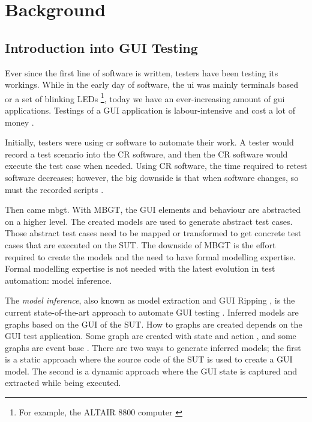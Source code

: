 \chapter{Background} \label{chapter:background}

\section{Introduction into GUI Testing}
Ever since the first line of software is written, testers have been testing its workings. While in the early day of software, the \acrfull{ui} was mainly terminals based or a set of blinking LEDs \cite{altair8800} \footnote{For example, the ALTAIR 8800 computer \cite{altair8800}}, today we have an ever-increasing amount of \acrfull{gui} applications. Testings of a GUI application is labour-intensive and cost a lot of money \cite{gui-history}.

Initially, testers were using \acrfull{cr} software to automate their work. A tester would record a test scenario into the CR software, and then the CR software would execute the test case when needed. Using CR software, the time required to retest software decreases; however, the big downside is that when software changes, so must the recorded scripts \cite{gui-history}.

Then came \acrfull{mbgt}. With MBGT, the GUI elements and behaviour are abstracted on a higher level. The created models are used to generate abstract test cases. Those abstract test cases need to be mapped or transformed to get concrete test cases that are executed on the SUT. The downside of MBGT is the effort required to create the models and the need to have formal modelling expertise. Formal modelling expertise is not needed with the latest evolution in test automation: model inference. 

The \emph{model inference}, also known as model extraction and GUI Ripping \cite{gui-ripping}, is the current state-of-the-art approach to automate GUI testing \cite{gui-history}. Inferred models are graphs based on the GUI of the SUT. How to graphs are created depends on the GUI test application. Some graph are created with state and action \cite{thesisMulders}, and some graphs are event base \cite{nguyen2014guitar}. There are two ways to generate inferred models; the first is a static approach where the source code of the  SUT is used to create a GUI model. The second is a dynamic approach where the GUI state is captured and extracted while being executed. 

